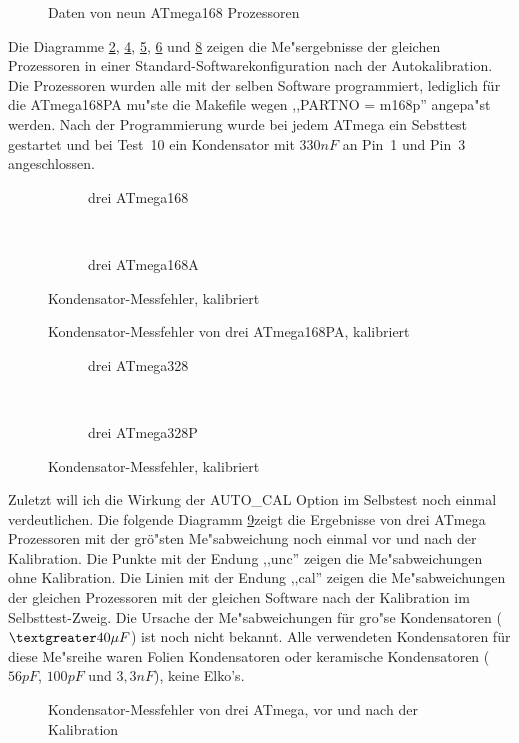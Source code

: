 \begin{figure}[H]
\centering

\caption{Daten von neun ATmega168 Prozessoren}
\label{fig:CompAdjust}
\end{figure}

Die Diagramme \ref{fig:mega168cal}, \ref{fig:mega168Acal}, \ref{fig:mega168PAcal},  \ref{fig:mega328cal} und
\ref{fig:mega328Pcal} zeigen die Me"sergebnisse
der gleichen Prozessoren in einer Standard-Softwarekonfiguration nach der Autokalibration.
Die Prozessoren wurden alle mit der selben Software programmiert, lediglich f\"ur die ATmega168PA mu"ste die
Makefile wegen ,,PARTNO = m168p'' angepa"st werden. Nach der Programmierung wurde bei jedem ATmega ein
Sebsttest gestartet und bei Test~10 ein Kondensator mit \(330 nF\) an Pin~1 und Pin~3 angeschlossen.

\begin{figure}[H]
  \begin{subfigure}[b]{9cm}
    \centering
    \resizebox{9cm}{!}{}
    \caption{drei ATmega168}
    \label{fig:mega168cal}
  \end{subfigure}
  ~
  \begin{subfigure}[b]{9cm}
    \centering
    \resizebox{9cm}{!}{}
    \caption{drei ATmega168A}
    \label{fig:mega168Acal}
  \end{subfigure}
  \caption{Kondensator-Messfehler, kalibriert}
\end{figure}

\begin{figure}[H]
\centering

\caption{Kondensator-Messfehler von drei ATmega168PA, kalibriert}
\label{fig:mega168PAcal}
\end{figure}

\begin{figure}[H]
  \begin{subfigure}[b]{9cm}
    \centering
    \resizebox{9cm}{!}{}
    \caption{drei ATmega328}
    \label{fig:mega328cal}
  \end{subfigure}
  ~
  \begin{subfigure}[b]{9cm}
    \centering
    \resizebox{9cm}{!}{}
    \caption{drei ATmega328P}
    \label{fig:mega328Pcal}
  \end{subfigure}
  \caption{Kondensator-Messfehler, kalibriert}
\end{figure}

Zuletzt will ich die Wirkung der AUTO\_CAL Option im Selbstest noch einmal verdeutlichen.
Die folgende Diagramm \ref{fig:MegaAuto}zeigt die Ergebnisse von drei ATmega Prozessoren 
mit der gr\"o"sten Me"sabweichung noch einmal vor und nach der Kalibration.
Die Punkte mit der Endung ,,unc'' zeigen die Me"sabweichungen ohne Kalibration.
Die Linien mit der Endung ,,cal'' zeigen die Me"sabweichungen der gleichen Prozessoren
mit der gleichen Software nach der Kalibration im Selbsttest-Zweig.
Die Ursache der Me"sabweichungen f\"ur gro"se Kondensatoren (\( \textgreater 40 \mu F\)) ist
noch nicht bekannt. Alle verwendeten Kondensatoren f\"ur diese Me"sreihe waren
Folien Kondensatoren oder keramische Kondensatoren (\(56 pF\), \(100 pF\) und \(3,3 nF\)), keine Elko's.

\begin{figure}[H]
\centering

\caption{Kondensator-Messfehler von drei ATmega, vor und nach der Kalibration}
\label{fig:MegaAuto}
\end{figure}
